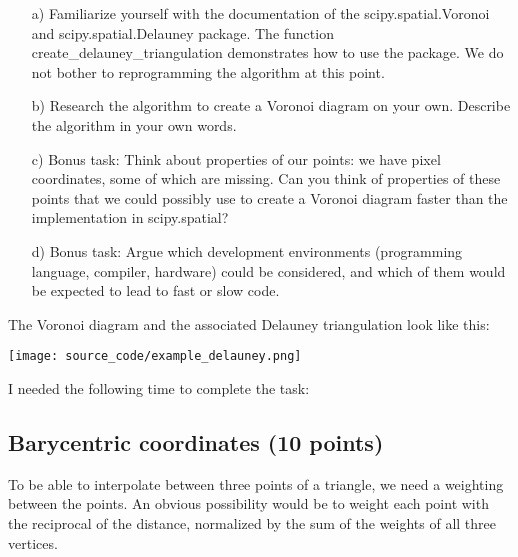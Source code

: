 \begin{enumerate}

\item[a)] Familiarize yourself with the documentation of the scipy.spatial.Voronoi and scipy.spatial.Delauney package. The function create\_delauney\_triangulation demonstrates how to use the package. We do not bother to reprogramming the algorithm at this point. 

\item[b)] Research the algorithm to create a Voronoi diagram on your own. Describe the algorithm in your own words.

\item[c)] Bonus task: Think about properties of our points: we have pixel coordinates, some of which are missing. Can you think of properties of these points that we could possibly use to create a Voronoi diagram faster than the implementation in scipy.spatial? 

\item[d)] Bonus task: Argue which development environments (programming language, compiler, hardware) could be considered, and which of them would be expected to lead to fast or slow code.

\end{enumerate}

The Voronoi diagram and the associated Delauney triangulation look like this:

\begin{center}
\texttt{[image: source\_code/example\_delauney.png]}
\end{center}

I needed the following time to complete the task:

\subsection{Barycentric coordinates (10 points)}

To be able to interpolate between three points of a triangle, we need a weighting between the points. An obvious possibility would be to weight each point with the reciprocal of the distance, normalized by the sum of the weights of all three vertices. 

